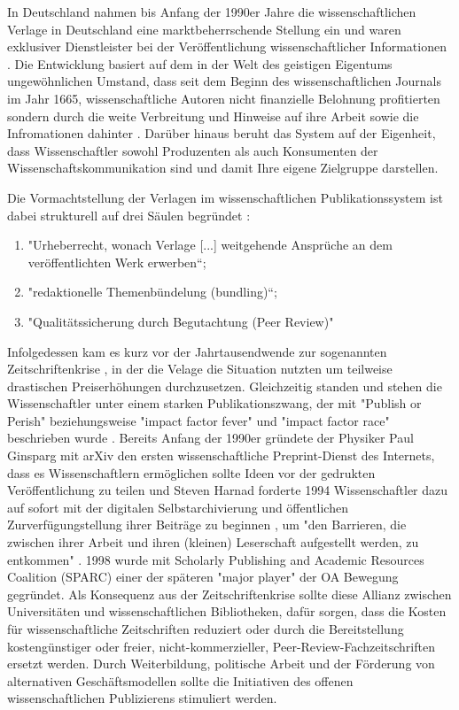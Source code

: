 In Deutschland nahmen bis Anfang der 1990er Jahre die wissenschaftlichen Verlage in Deutschland eine marktbeherrschende Stellung ein und waren exklusiver Dienstleister bei der Veröffentlichung wissenschaftlicher Informationen \cite{schloegl_2005} \cite{offhaus_2012_institutionelle_repos}. Die Entwicklung basiert auf dem in der Welt des geistigen Eigentums ungewöhnlichen Umstand, dass seit dem Beginn des wissenschaftlichen Journals im Jahr 1665, wissenschaftliche Autoren nicht finanzielle Belohnung profitierten sondern durch die weite Verbreitung und Hinweise auf ihre Arbeit sowie die Infromationen dahinter \cite{albert_2006_open_implications}. Darüber hinaus beruht das System auf der Eigenheit, dass Wissenschaftler sowohl Produzenten als auch Konsumenten der Wissenschaftskommunikation sind und damit Ihre eigene Zielgruppe darstellen\cite{Hess_2006}.

Die Vormachtstellung der Verlagen im wissenschaftlichen Publikationssystem ist dabei strukturell auf drei Säulen begründet \cite{offhaus_2012_institutionelle_repos} \cite{bargheer_2006_open}: 
\begin{enumerate}
\item "Urheberrecht, wonach Verlage [...] weitgehende Ansprüche an dem veröffentlichten Werk erwerben“;
\item "redaktionelle Themenbündelung (bundling)“;
\item "Qualitätssicherung durch Begutachtung (Peer Review)"
\end{enumerate}

Infolgedessen kam es kurz vor der Jahrtausendwende zur sogenannten Zeitschriftenkrise \cite{suchen}, in der die Velage die Situation nutzten um teilweise drastischen Preiserhöhungen durchzusetzen. Gleichzeitig standen und stehen die Wissenschaftler unter einem starken Publikationszwang, der mit "Publish or Perish" \cite{CLAPHAM_2005} beziehungsweise "impact factor fever" \cite{Cherubini_2008} und "impact factor race" \cite{Brischoux_2009} beschrieben wurde \cite{offhaus_2012_institutionelle_repos}. Bereits Anfang der 1990er gründete der Physiker Paul Ginsparg mit arXiv den ersten wissenschaftliche Preprint-Dienst des Internets, dass es Wissenschaftlern ermöglichen sollte Ideen vor der gedrukten Veröffentlichung zu teilen und Steven Harnad forderte 1994 Wissenschaftler dazu auf sofort mit der digitalen Selbstarchivierung und öffentlichen Zurverfügungstellung ihrer Beiträge zu beginnen \cite{albert_2006_open_implications}, um "den Barrieren, die zwischen ihrer Arbeit und ihren (kleinen) Leserschaft aufgestellt werden, zu entkommen" \cite{harnad_1995_subversive_proposal}. 1998 wurde mit Scholarly Publishing and Academic Resources Coalition (SPARC) einer der späteren "major player" der OA Bewegung\cite{russell2008business} gegründet. Als Konsequenz aus der Zeitschriftenkrise sollte diese Allianz zwischen Universitäten und wissenschaftlichen Bibliotheken, dafür sorgen, dass die Kosten für wissenschaftliche Zeitschriften reduziert oder durch die Bereitstellung kostengünstiger oder freier, nicht-kommerzieller, Peer-Review-Fachzeitschriften ersetzt werden. Durch Weiterbildung, politische Arbeit und der Förderung von alternativen Geschäftsmodellen sollte die Initiativen des offenen wissenschaftlichen Publizierens stimuliert werden\cite{suchen}.


